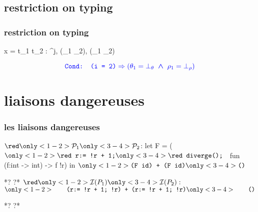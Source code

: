 \documentclass[xcolor=dvipsnames]{beamer}
\newcommand{\bwedge}{\boldsymbol{~\wedge~}}
\newcommand{\bvee}{\boldsymbol{~\vee~}}
\begin{document}
\subsection*{restriction on typing}
\begin{frame}[fragile]
\frametitle{restriction on typing}
			{\vspace*{-1em}\hspace*{-2.1em}{\red \Gamma} \vdash {} x = t_1  t_2 
				: {\red \tau^{j}, 
				(\theta_1 \bvee \theta_2), 
				(\rho_1 \bvee \rho_2)} \phantom{tttttttt}}

\bigskip
$$ \textcolor{blue}{\texttt{Cond: } \texttt{(i = 2)} \Rightarrow 
			(\theta_1 = \bot_{\theta}\bwedge \rho_1 = \bot_{\rho})}$$
\end{frame}
\addtocounter{framenumber}{-1}

\section*{liaisons dangereuses}
\begin{frame}[fragile]
\frametitle{les liaisons dangereuses}
\hspace*{-1em}
\begin{small}
\begin{whycode} 
${\red \only<1-2>{\mathcal{P}_1}\only<3-4>{\mathcal{P}_2}}$: 
   let F = ($\only<1-2>{\texttt{\red r:= !r + 1;}}\only<3-4>{\texttt{\red diverge(); }}$ fun (f:int -> int) -> f !r)
   in $\only<1-2>{\texttt{(F id) + (F id)}}\only<3-4>{\texttt{()}}$
   
*?%
?* 
${\red\only<1-2>{ \mathcal{I}(P_1)}\only<3-4>{\mathcal{I}(P_2)}}:$ 
$\only<1-2>{\qquad \texttt{(r:= !r + 1; !r) + (r:= !r + 1; !r)}}
\only<3-4>{\qquad \texttt{()}}$ 
   
*?%
?*
\end{whycode}
\end{small} \bigskip
{}
\end{frame}
\end{document}
